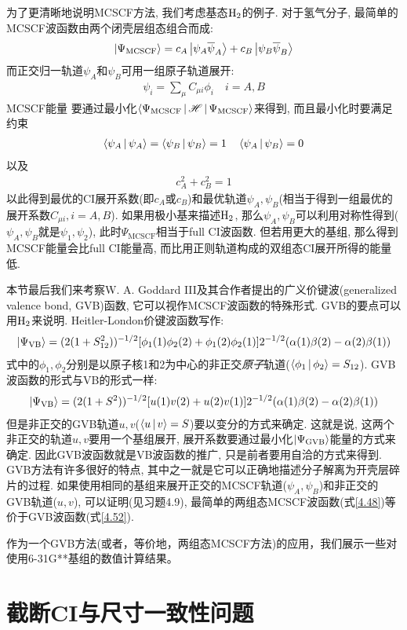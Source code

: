 为了更清晰地说明MCSCF方法, 
我们考虑基态$\mathrm{H}_2$的例子. 
对于氢气分子, 
最简单的MCSCF波函数由两个闭壳层组态组合而成:
\begin{align}\label{4.48}
\Ket{\Psi_\mathrm{MCSCF}} = c_A\Ket{\psi_A\overline{\psi}_A} + c_B\Ket{\psi_B\overline{\psi}_B} 
\end{align}
而正交归一轨道$\psi_A$和$\psi_B$可用一组原子轨道展开:
\begin{align}
\psi_i=\sum_\mu C_{\mu i}\phi_i\quad i=A,B
\end{align}
MCSCF能量 要通过最小化$\Braket{\Psi_\mathrm{MCSCF}|\mathscr{H}|\Psi_\mathrm{MCSCF}}$来得到, 而且最小化时要满足约束
\begin{align}
\Braket{\psi_A|\psi_A} = \Braket{\psi_B|\psi_B}=1\quad \Braket{\psi_A|\psi_B}=0
\end{align}
以及
\begin{align}
c_A^2 + c_B^2 = 1
\end{align}
以此得到最优的CI展开系数(即$c_A$或$c_B$)和最优轨道$\psi_A,\psi_B$(相当于得到一组最优的展开系数$C_{\mu i}, i=A,B$). 
如果用极小基来描述$\mathrm{H}_2$, 
那么$\psi_A,\psi_B$可以利用对称性得到($\psi_A,\psi_B$就是$\psi_1,\psi_2$), 
此时$\Psi_\mathrm{MCSCF}$相当于full CI波函数. 
但若用更大的基组, 
那么得到MCSCF能量会比full CI能量高, 
而比用\hft 正则轨道构成的双组态CI展开所得的能量低.


本节最后我们来考察W. A. Goddard III及其合作者提出的广义价键波(generalized valence bond, 
GVB)函数, 
它可以视作MCSCF波函数的特殊形式. 
GVB的要点可以用$\mathrm{H}_2$来说明. 
Heitler-London价键波函数写作:
\begin{align}
\Ket{\Psi_\mathrm{VB}} = (2(1+S_{12}^2))^{-1/2} [\phi_1(1)\phi_2(2) + \phi_1(2)\phi_2(1)]2^{-1/2}(\alpha(1)\beta(2)-\alpha(2)\beta(1))
\end{align}
式中的$\phi_1,\phi_2$分别是以原子核1和2为中心的非正交\emph{原子}轨道($\Braket{\phi_1|\phi_2}=S_{12}$). 
GVB波函数的形式与VB的形式一样:
\begin{align}\label{4.52}
	\Ket{\Psi_\mathrm{VB}} = (2(1+S^2))^{-1/2} [u(1)v(2) + u(2)v(1)]2^{-1/2}(\alpha(1)\beta(2)-\alpha(2)\beta(1))
\end{align}
但是非正交的GVB轨道$u,v$($\Braket{u|v}=S$)要以变分的方式来确定. 
这就是说, 
这两个非正交的轨道$u,v$要用一个基组展开, 
展开系数要通过最小化$\Ket{\Psi_\mathrm{GVB}}$能量的方式来确定. 
因此GVB波函数就是VB波函数的推广, 
只是前者要用自洽的方式来得到. 
GVB方法有许多很好的特点, 
其中之一就是它可以正确地描述分子解离为开壳层碎片的过程. 
如果使用相同的基组来展开正交的MCSCF轨道($\psi_A,\psi_B$)和非正交的GVB轨道($u,v$), 
可以证明(见习题4.9), 
最简单的两组态MCSCF波函数(式\eqref{4.48})等价于GVB波函数(式\eqref{4.52}).


\exercise{}


作为一个GVB方法(或者，等价地，两组态MCSCF方法)的应用，我们展示一些对使用6-31G**基组的数值计算结果。


\section{截断CI与尺寸一致性问题}
\label{sec4.6}
\theendnotes
